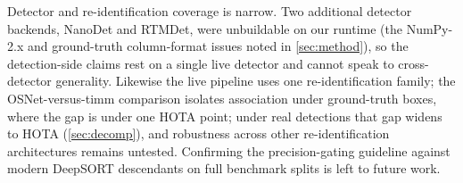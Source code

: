 Detector and re-identification coverage is narrow. Two additional detector
backends, NanoDet and RTMDet, were unbuildable on our runtime (the NumPy-2.x
and ground-truth column-format issues noted in \cref{sec:method}), so the
detection-side claims rest on a single live detector and cannot speak to
cross-detector generality. Likewise the live pipeline uses one
re-identification family; the OSNet-versus-timm comparison
\cite{zhou2019osnet,wightman2019timm} isolates association under
ground-truth boxes, where the gap is under one HOTA point; under real detections
that gap widens to \reidRealGap{} HOTA (\cref{sec:decomp}), and robustness across
other re-identification architectures remains untested. Confirming the
precision-gating guideline against modern DeepSORT descendants
\cite{du2023strongsort,cao2023ocsort,aharon2022botsort} on full benchmark
splits is left to future work.
